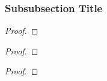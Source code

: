 \subsubsection{Subsubsection Title}

\begin{lemm}
    \lipsum[1]
\end{lemm}

\begin{proof}
    \lipsum[1]
\end{proof}

\begin{thrm}
    \lipsum[1]
\end{thrm}

\begin{proof}
    \lipsum[1]
\end{proof}

\begin{coro}
    \lipsum[1]
\end{coro}

\begin{proof}
    \lipsum[1]
\end{proof}

